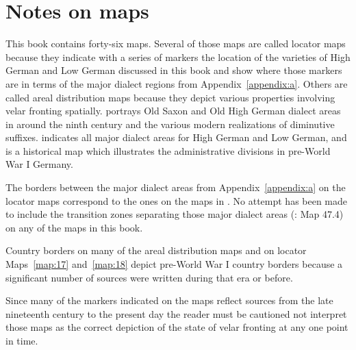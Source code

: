 \chapter*{Notes on maps}

This book contains forty-six maps. Several of those maps are called locator maps because they indicate with a series of markers the location of the varieties of High German and Low German discussed in this book and show where those markers are in terms of the major dialect regions from Appendix~\ref{appendix:a}. Others are called areal distribution maps because they depict various properties involving velar fronting spatially.  portrays Old Saxon and Old High German dialect areas in around the ninth century and  the various modern realizations of diminutive suffixes.  indicates all major dialect areas for High German and Low German, and  is a historical map which illustrates the administrative divisions in pre-World War I Germany.

The borders between the major dialect areas from Appendix~\ref{appendix:a} on the locator maps correspond to the ones on the maps in \citet{WiesingerRaffin1982}. No attempt has been made to include the transition zones separating those major dialect areas (\citealt{Wiesinger1983a}: Map 47.4) on any of the maps in this book.

\begin{sloppypar}
Country borders on many of the areal distribution maps and on locator Maps~\ref{map:17} and~\ref{map:18} depict pre-World War I country borders because a significant number of sources were written during that era or before.
\end{sloppypar}

Since many of the markers indicated on the maps reflect sources from the late nineteenth century to the present day the reader must be cautioned not interpret those maps as the correct depiction of the state of velar fronting at any one point in time.
